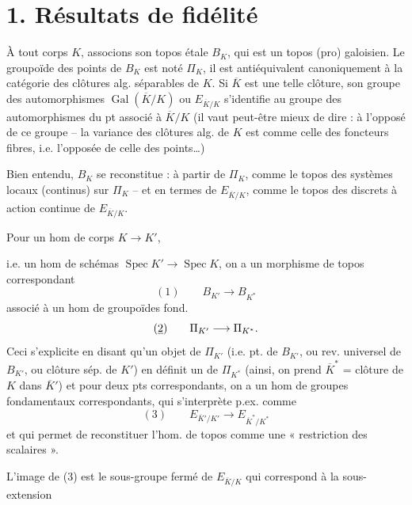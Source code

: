 \documentclass[11pt,a4paper]{article}
\begin{document}
\section{1. Résultats de fidélité}

À tout corps $K$, associons son topos étale $B_K$, qui est un topos (pro) galoisien. Le groupoïde des points de $B_K$ est noté $\Pi_K$, il est antiéquivalent canoniquement à la catégorie des clôtures alg. séparables de $K$. Si $\overline{K}$ est une telle clôture, son groupe des automorphismes $\operatorname{Gal}(\overline{K}/K)$ ou $E_{\overline{K}/K}$ s'identifie au groupe des automorphismes du pt  associé à $\overline{K}/K$ (il vaut peut-être mieux de dire : à l'opposé de ce groupe --  la variance des clôtures alg. de $K$ est comme celle des foncteurs fibres, i.e. l'opposée de celle des points…)

Bien entendu, $B_K$ se reconstitue : à partir de $\Pi_K$, comme le topos des systèmes locaux (continus) sur $\Pi_K$ -- et en termes de $E_{\overline{K}/K}$, comme le topos des  discrets à action continue de $E_{\overline{K}/K}$.

Pour un hom de corps $K \to K'$,

i.e. un hom de schémas $\operatorname{Spec} K' \to \operatorname{Spec} K$, on a un morphisme de topos correspondant
\[
  (1)\qquad B_{K'} \longrightarrow B_{K^{*}}
\]
associé à un hom de groupoïdes fond.
\[
  (\uncertain{2})\qquad \Pi_{K'} \longrightarrow \Pi_{K^{*}} .
\]
Ceci s'explicite en disant qu'un  objet de $\Pi_{K'}$ (i.e. pt. de $B_{K'}$, ou rev. universel de $B_{K'}$, ou clôture sép.  de $K'$) en définit un de $\Pi_{K^{*}}$ (ainsi, on prend $\overline{K}^{*}$ = clôture   de $K$ dans $\overline{K}'$) et pour deux pts correspondants, on a un hom de groupes fondamentaux correspondants, qui s'interprète p.ex. comme
\[
  (3)\qquad E_{\overline{K}'/K'} \longrightarrow E_{\overline{K}^{*}/K^{*}}
\]
et qui permet de reconstituer l'hom. de topos comme une « restriction des scalaires ».

L'image de (3) est le sous-groupe fermé de $E_{\overline{K}/K}$ qui correspond à la sous-extension
\end{document}
